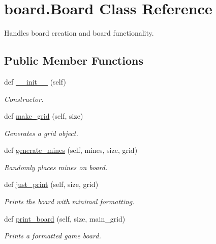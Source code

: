 \hypertarget{classboard_1_1_board}{}\section{board.\+Board Class Reference}
\label{classboard_1_1_board}


Handles board creation and board functionality.  


\subsection*{Public Member Functions}
\begin{DoxyCompactItemize}
\item 
def \mbox{\hyperlink{classboard_1_1_board_a35203bbf9b43a84ecfea81eb7cbe66fd}{\+\_\+\+\_\+init\+\_\+\+\_\+}} (self)
\begin{DoxyCompactList}\small\item\em Constructor. \end{DoxyCompactList}\item 
def \mbox{\hyperlink{classboard_1_1_board_a4ffbe3bf5cb58f50e54bdbfda4a65821}{make\+\_\+grid}} (self, size)
\begin{DoxyCompactList}\small\item\em Generates a grid object. \end{DoxyCompactList}\item 
def \mbox{\hyperlink{classboard_1_1_board_a5e113da353a5a720bad75a36168d5cf8}{generate\+\_\+mines}} (self, mines, size, grid)
\begin{DoxyCompactList}\small\item\em Randomly places mines on board. \end{DoxyCompactList}\item 
def \mbox{\hyperlink{classboard_1_1_board_a5c9f128c1b2f9b5a6e46d38a592246ee}{just\+\_\+print}} (self, size, grid)
\begin{DoxyCompactList}\small\item\em Prints the board with minimal formatting. \end{DoxyCompactList}\item 
def \mbox{\hyperlink{classboard_1_1_board_a8bdf74538bc47d64bd0c029b6fc5b653}{print\+\_\+board}} (self, size, main\+\_\+grid)
\begin{DoxyCompactList}\small\item\em Prints a formatted game board. \end{DoxyCompactList}\item 

\end{DoxyCompactItemize}
